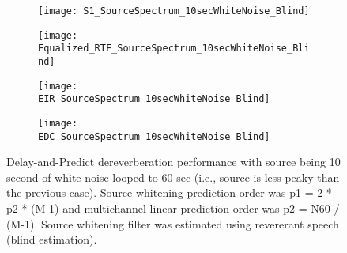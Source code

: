 \begin{figure}[H]
	\centering
	\begin{subfigure}[b]{0.49\textwidth}
		\centering
		\texttt{[image: S1\_SourceSpectrum\_10secWhiteNoise\_Blind]}
	\end{subfigure}
	\hfill
	\begin{subfigure}[b]{0.49\textwidth}
		\centering
		\texttt{[image: Equalized\_RTF\_SourceSpectrum\_10secWhiteNoise\_Blind]}
	\end{subfigure}
	\hfill
	\begin{subfigure}[b]{0.49\textwidth}
		\centering
		\texttt{[image: EIR\_SourceSpectrum\_10secWhiteNoise\_Blind]}
	\end{subfigure}
	\hfill
	\begin{subfigure}[b]{0.49\textwidth}
		\centering
		\texttt{[image: EDC\_SourceSpectrum\_10secWhiteNoise\_Blind]}
	\end{subfigure}
	\hfill
	\caption{Delay-and-Predict dereverberation performance with source being 10 second of white noise looped to 60 sec (i.e., source is less peaky than the previous case). Source whitening prediction order was p1 = 2 * p2 * (M-1) and multichannel linear prediction order was p2 = N60 / (M-1). Source whitening filter was estimated using revererant speech (blind estimation).}
	\label{fig:params_source_spectrum_10sec_blind}
\end{figure}



